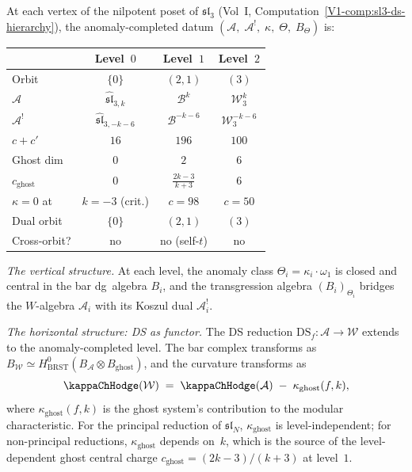 \begin{construction}
At each vertex of the nilpotent poset of $\mathfrak{sl}_3$
(Vol~I, Computation~\ref*{V1-comp:sl3-ds-hierarchy}), the
anomaly-completed datum
$(\mathcal A,\;\mathcal A^!,\;\kappa,\;\Theta,\;B_\Theta)$
is:
\begin{center}
\renewcommand{\arraystretch}{1.3}
\begin{tabular}{lccc}
& \textbf{Level~$0$} & \textbf{Level~$1$} & \textbf{Level~$2$} \\
\hline
Orbit & $\{0\}$ & $(2,1)$ & $(3)$ \\[2pt]
$\mathcal A$ &
 $\widehat{\mathfrak{sl}}_{3,k}$ &
 $\mathcal B^k$ &
 $\mathcal W_3^k$ \\[2pt]
$\mathcal A^!$ &
 $\widehat{\mathfrak{sl}}_{3,-k-6}$ &
 $\mathcal B^{-k-6}$ &
 $\mathcal W_3^{-k-6}$ \\[2pt]
$c+c'$ & $16$ & $196$ & $100$ \\[2pt]
Ghost dim & $0$ & $2$ & $6$ \\[2pt]
$c_{\mathrm{ghost}}$ &
 $0$ &
 $\frac{2k-3}{k+3}$ &
 $6$ \\[2pt]
$\kappa=0$ at & $k=-3$ (crit.) &
 $c=98$ & $c=50$ \\[2pt]
Dual orbit & $\{0\}$ & $(2,1)$ & $(3)$ \\[2pt]
Cross-orbit? & no & no (self-$t$) & no
\end{tabular}
\end{center}

\emph{The vertical structure.}
At each level, the anomaly class $\Theta_i=\kappa_i\cdot\omega_1$
is closed and central in the bar dg~algebra $B_i$, and the
transgression algebra $(B_i)_{\Theta_i}$ bridges the
$W$-algebra $\mathcal A_i$ with its Koszul dual
$\mathcal A_i^!$.

\emph{The horizontal structure: DS as functor.}
The DS reduction $\mathrm{DS}_f\colon\mathcal A\to\mathcal W$
extends to the anomaly-completed level. The bar complex
transforms as
$B_{\mathcal W}\simeq H^0_{\mathrm{BRST}}(B_{\mathcal A}
\otimes B_{\mathrm{ghost}})$,
and the curvature transforms as
\begin{equation}%
\kappaChHodge(\mathcal W)
\;=\;
\kappaChHodge(\mathcal A)
\;-\;
\kappa_{\mathrm{ghost}}(f,k),
\end{equation}
where $\kappa_{\mathrm{ghost}}(f,k)$ is the ghost system's
contribution to the modular characteristic. For the principal
reduction of $\mathfrak{sl}_N$, $\kappa_{\mathrm{ghost}}$ is
level-independent; for non-principal reductions,
$\kappa_{\mathrm{ghost}}$ depends on~$k$, which is the source
of the level-dependent ghost central charge
$c_{\mathrm{ghost}}=(2k{-}3)/(k{+}3)$ at level~$1$.


\end{construction}
